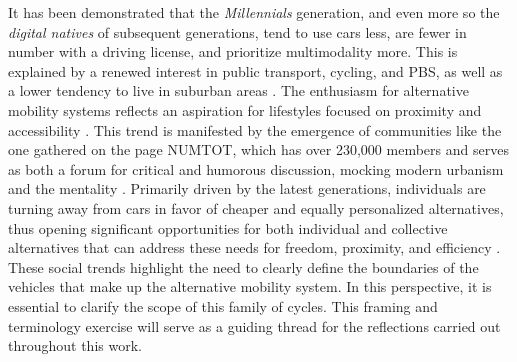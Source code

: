 \begin{refsegment}
It has been demonstrated that the \textsl{Millennials} generation, and even more so the \textsl{digital natives} of subsequent generations, tend to use cars less, are fewer in number with a driving license, and prioritize multimodality more. This is explained by a renewed interest in public transport, cycling, and \acrshort{PBS}, as well as a lower tendency to live in suburban areas \textcolor{blue}{\autocites[62-63]{polzin_impact_2014}[32-39]{circella_what_2016}{garikapati_activity_2016}[7]{hntb_america_2016}[9-10]{alfaraz_youth_2017}[12]{wang_bike_2018}}. The enthusiasm for alternative mobility systems reflects an aspiration for lifestyles focused on proximity and accessibility \textcolor{blue}{\autocite[99-100]{levine_mobility_2019}}. This trend is manifested by the emergence of communities like the one gathered on the  page \acrfull{NUMTOT}, which has over 230,000 members and serves as both a forum for critical and humorous discussion, mocking modern urbanism and the  mentality \autocites{bliss_future_2018}{demain_la_ville_numtot_2018}. Primarily driven by the latest generations, individuals are turning away from cars in favor of cheaper and equally personalized alternatives, thus opening significant opportunities for both individual and collective alternatives that can address these needs for freedom, proximity, and efficiency \textcolor{blue}{\autocite[11]{frere_services_2018}}. These social trends highlight the need to clearly define the boundaries of the vehicles that make up the alternative mobility system. In this perspective, it is essential to clarify the scope of this family of cycles. This framing and terminology exercise will serve as a guiding thread for the reflections carried out throughout this work.%


\end{refsegment}
